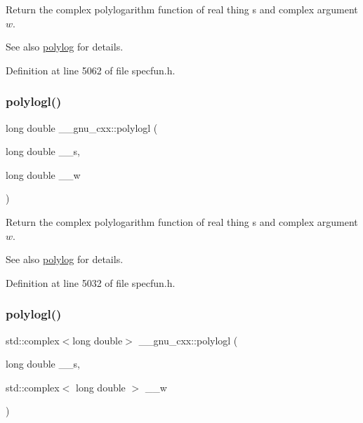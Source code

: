 Return the complex polylogarithm function of real thing {\ttfamily s} and complex argument $ w $.

\begin{DoxySeeAlso}{See also}
\hyperlink{group__gnu__math__spec__func_gabcc5480ad739561c2debd6a8a352084f}{polylog} for details. 
\end{DoxySeeAlso}


Definition at line 5062 of file specfun.\+h.

\mbox{\label{group__gnu__math__spec__func_ga3aa007b4b4e345c30be015ab145d5598}} 
\subsubsection{\texorpdfstring{polylogl()}{polylogl()}\hspace{0.1cm}{\footnotesize\ttfamily [1/2]}}
{\footnotesize\ttfamily long double \+\_\+\+\_\+gnu\+\_\+cxx\+::polylogl (\begin{DoxyParamCaption}\item[{long double}]{\+\_\+\+\_\+s,  }\item[{long double}]{\+\_\+\+\_\+w }\end{DoxyParamCaption})\hspace{0.3cm}{\ttfamily [inline]}}

Return the complex polylogarithm function of real thing {\ttfamily s} and complex argument $ w $.

\begin{DoxySeeAlso}{See also}
\hyperlink{group__gnu__math__spec__func_gabcc5480ad739561c2debd6a8a352084f}{polylog} for details. 
\end{DoxySeeAlso}


Definition at line 5032 of file specfun.\+h.

\mbox{\label{group__gnu__math__spec__func_ga9eb79e506eda210610bc59c1912b4d0f}} 
\subsubsection{\texorpdfstring{polylogl()}{polylogl()}\hspace{0.1cm}{\footnotesize\ttfamily [2/2]}}
{\footnotesize\ttfamily std\+::complex$<$long double$>$ \+\_\+\+\_\+gnu\+\_\+cxx\+::polylogl (\begin{DoxyParamCaption}\item[{long double}]{\+\_\+\+\_\+s,  }\item[{std\+::complex$<$ long double $>$}]{\+\_\+\+\_\+w }\end{DoxyParamCaption})\hspace{0.3cm}{\ttfamily [inline]}}

